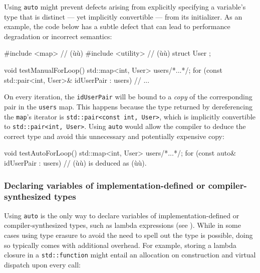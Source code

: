 Using \lstinline!auto! might prevent defects arising from explicitly
specifying a variable's type that is distinct --- yet implicitly
convertible --- from its initializer. As an example, the code below has
a subtle defect that can lead to performance degradation or incorrect
semantics:

\begin{emcppshiddenlisting}[emcppsbatch={e6,e7}]
#include <map>      // (ù{}ù)
#include <utility>  // (ù{}ù)
struct User {};
\end{emcppshiddenlisting}
\begin{emcppslisting}[emcppsbatch=e6]
void testManualForLoop()
{
    std::map<int, User> users{/*...*/};
    for (const std::pair<int, User>& idUserPair : users)
    {
        // ...
    }
}
\end{emcppslisting}
    
\noindent On every iteration, the \lstinline!idUserPair! will be bound to a
\emph{copy} of the corresponding pair in the \lstinline!users! map. This
happens because the type returned by dereferencing the \lstinline!map!'s
iterator is \lstinline!std::pair<const!~\lstinline!int,!~\lstinline!User>!, which
is implicitly convertible to \lstinline!std::pair<int,!~\lstinline!User>!.
Using \lstinline!auto! would allow the compiler to deduce the correct type
and avoid this unnecessary and potentially expensive copy:

\begin{emcppslisting}[emcppsbatch=e7]
void testAutoForLoop()
{
    std::map<int, User> users{/*...*/};
    for (const auto& idUserPair : users)
    {
        // (ù{}ù) is deduced as (ù{}ù).
    }
}
\end{emcppslisting}
    

\subsubsection[Declaring variables of implementation-defined or compiler-synthesized types]{Declaring variables of implementation-defined or compiler-synthesized types}\label{declaring-variables-of-implementation-defined-or-compiler-synthesized-types}

Using \lstinline!auto! is the only way to declare variables of
implementation-defined or compiler-synthesized types, such as
lambda expressions (see ). While in some cases 
using type erasure to avoid the need to spell out the type is possible, doing so typically
comes with additional overhead. For example, storing a lambda closure in
a \lstinline!std::function! might entail an allocation on construction and
virtual dispatch upon every call:

